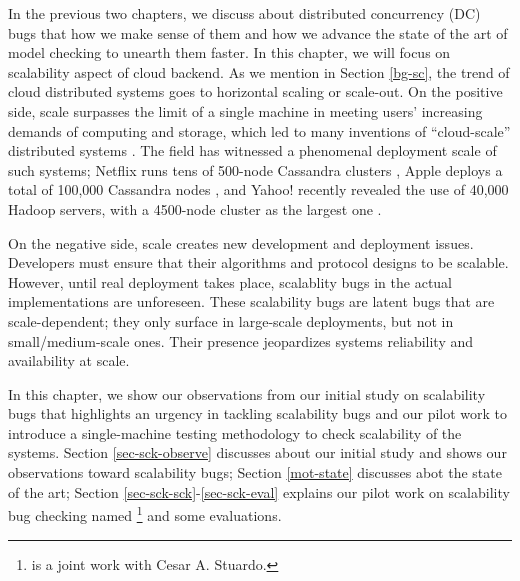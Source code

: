 
In the previous two chapters, we discuss about distributed concurrency (DC) bugs
that how we make sense of them and how we advance the state of the art of model
checking to unearth them faster. In this chapter, we will focus on
scalability aspect of cloud backend. As we mention in Section \ref{bg-sc}, the
trend of cloud distributed systems goes to horizontal scaling or scale-out.
On the positive side, scale surpasses the limit of a single machine in
meeting users' increasing demands of computing and storage, which led to
many inventions of ``cloud-scale'' distributed systems
\cite{Chang+06-BigTable, 
DeanGhemawat04-MapReduce, 
DeCandia+07-Dynamo,
Ghemawat+03-GoogleFS, 
Hindman+11-Mesos,
Verma+15-Borg}. The field has witnessed a
phenomenal deployment scale of such systems;
%
Netflix runs tens of 500-node Cassandra clusters \cite{RunningNetflix13},
Apple deploys a total of 100,000 Cassandra nodes \cite{WikiCassandra}, 
and Yahoo! recently revealed the use of 40,000 Hadoop servers,
with a 4500-node cluster as the largest one \cite{LargestHadoop}.

On the negative side, scale creates new development and deployment issues.
Developers must ensure that their algorithms and protocol designs to be
scalable.  However, until real deployment takes place, scalablity bugs in the
actual implementations are unforeseen.
These scalability bugs are latent bugs that are scale-dependent; they only
surface in large-scale deployments, but not in small/medium-scale ones. Their
presence jeopardizes systems reliability and availability at scale.

In this chapter, we show our observations from our initial study on scalability
bugs that highlights an urgency in tackling scalability bugs and our pilot work
to introduce a single-machine testing methodology to check scalability of the
systems. Section \ref{sec-sck-observe} discusses about our initial study and shows our
observations toward scalability bugs; Section \ref{mot-state} discusses abot the state
of the art; Section \ref{sec-sck-sck}-\ref{sec-sck-eval} explains our pilot work on scalability
bug checking named \sck
\footnote{
\sck is a joint work with Cesar A. Stuardo.
} and some evaluations.


